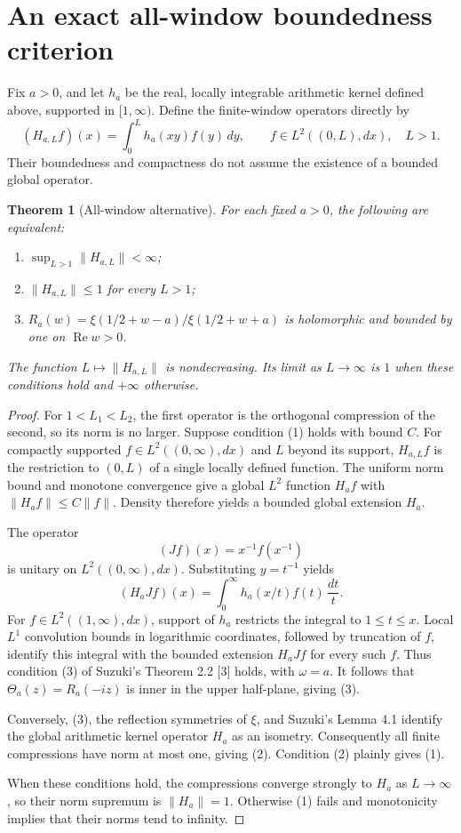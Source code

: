 \documentclass[11pt,letterpaper]{article}
\newtheorem{theorem}{Theorem}
\begin{document}
\section{An exact all-window boundedness criterion}
Fix $a>0$, and let $h_a$ be the real, locally integrable arithmetic kernel
defined above, supported in $[1,\infty)$.  Define the finite-window operators
directly by
\[
 (H_{a,L}f)(x)=\int_0^L h_a(xy)f(y)\,dy,
 \qquad f\in L^2((0,L),dx),\quad L>1.
\]
Their boundedness and compactness do not assume the existence of a bounded
global operator.

\begin{theorem}[All-window alternative]\label{thm:allwindow}
For each fixed $a>0$, the following are equivalent:
\begin{enumerate}
\item $\sup_{L>1}\|H_{a,L}\|<\infty$;
\item $\|H_{a,L}\|\leq1$ for every $L>1$;
\item $R_a(w)=\xi(1/2+w-a)/\xi(1/2+w+a)$ is holomorphic and bounded by one
      on $\operatorname{Re}w>0$.
\end{enumerate}
The function $L\mapsto\|H_{a,L}\|$ is nondecreasing.  Its limit as
$L\to\infty$ is $1$ when these conditions hold and $+\infty$ otherwise.
\end{theorem}

\begin{proof}
For $1<L_1<L_2$, the first operator is the orthogonal compression of the
second, so its norm is no larger.  Suppose condition (1) holds with bound
$C$.  For compactly supported $f\in L^2((0,\infty),dx)$ and $L$ beyond
its support, $H_{a,L}f$ is the restriction to $(0,L)$ of a single locally
defined function.  The uniform norm bound and monotone convergence give
a global $L^2$ function $H_af$ with $\|H_af\|\leq C\|f\|$.  Density
therefore yields a bounded global extension $H_a$.

The operator
\[
 (Jf)(x)=x^{-1}f(x^{-1})
\]
is unitary on $L^2((0,\infty),dx)$.  Substituting $y=t^{-1}$ yields
\[
 (H_aJf)(x)=\int_0^\infty h_a(x/t)f(t)\,\frac{dt}{t}.
\]
For $f\in L^2((1,\infty),dx)$, support of $h_a$ restricts the integral
to $1\leq t\leq x$.  Local $L^1$ convolution bounds in logarithmic
coordinates, followed by truncation of $f$, identify this integral with
the bounded extension $H_aJf$ for every such $f$.  Thus condition (3) of
Suzuki's Theorem 2.2 [3] holds, with $\omega=a$.  It follows
that $\Theta_a(z)=R_a(-iz)$ is inner in the upper half-plane, giving (3).

Conversely, (3), the reflection symmetries of $\xi$, and Suzuki's
Lemma 4.1 identify the global arithmetic kernel operator $H_a$ as an
isometry.  Consequently all finite compressions have norm at most one,
giving (2).  Condition (2) plainly gives (1).

When these conditions hold, the compressions converge strongly to $H_a$
as $L\to\infty$, so their norm supremum is $\|H_a\|=1$.  Otherwise (1)
fails and monotonicity implies that their norms tend to infinity.
\end{proof}
\end{document}
